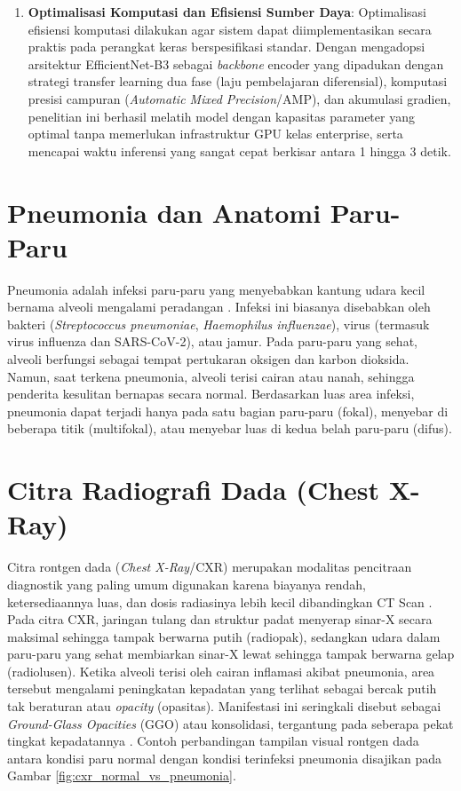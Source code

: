 \documentclass[12pt,a4paper,oneside]{book}
\begin{document}
\begin{enumerate}
  \item \textbf{Optimalisasi Komputasi dan Efisiensi Sumber Daya}: 
  Optimalisasi efisiensi komputasi dilakukan agar sistem dapat diimplementasikan secara praktis pada perangkat keras berspesifikasi standar. Dengan mengadopsi arsitektur EfficientNet-B3 sebagai \textit{backbone} encoder yang dipadukan dengan strategi transfer learning dua fase (laju pembelajaran diferensial), komputasi presisi campuran (\textit{Automatic Mixed Precision}/AMP), dan akumulasi gradien, penelitian ini berhasil melatih model dengan kapasitas parameter yang optimal tanpa memerlukan infrastruktur GPU kelas enterprise, serta mencapai waktu inferensi yang sangat cepat berkisar antara 1 hingga 3 detik.
\end{enumerate}


\section{Pneumonia dan Anatomi Paru-Paru}

Pneumonia adalah infeksi paru-paru yang menyebabkan kantung udara kecil bernama alveoli mengalami peradangan \parencite{xu2020}. Infeksi ini biasanya disebabkan oleh bakteri (\textit{Streptococcus pneumoniae}, \textit{Haemophilus influenzae}), virus (termasuk virus influenza dan SARS-CoV-2), atau jamur. Pada paru-paru yang sehat, alveoli berfungsi sebagai tempat pertukaran oksigen dan karbon dioksida. Namun, saat terkena pneumonia, alveoli terisi cairan atau nanah, sehingga penderita kesulitan bernapas secara normal. Berdasarkan luas area infeksi, pneumonia dapat terjadi hanya pada satu bagian paru-paru (fokal), menyebar di beberapa titik (multifokal), atau menyebar luas di kedua belah paru-paru (difus).

\section{Citra Radiografi Dada (Chest X-Ray)}

Citra rontgen dada (\textit{Chest X-Ray}/CXR) merupakan modalitas pencitraan diagnostik yang paling umum digunakan karena biayanya rendah, ketersediaannya luas, dan dosis radiasinya lebih kecil dibandingkan CT Scan \parencite{seth2022}. Pada citra CXR, jaringan tulang dan struktur padat menyerap sinar-X secara maksimal sehingga tampak berwarna putih (radiopak), sedangkan udara dalam paru-paru yang sehat membiarkan sinar-X lewat sehingga tampak berwarna gelap (radiolusen). Ketika alveoli terisi oleh cairan inflamasi akibat pneumonia, area tersebut mengalami peningkatan kepadatan yang terlihat sebagai bercak putih tak beraturan atau \textit{opacity} (opasitas). Manifestasi ini seringkali disebut sebagai \textit{Ground-Glass Opacities} (GGO) atau konsolidasi, tergantung pada seberapa pekat tingkat kepadatannya \parencite{teixeira2020}. Contoh perbandingan tampilan visual rontgen dada antara kondisi paru normal dengan kondisi terinfeksi pneumonia disajikan pada Gambar \ref{fig:cxr_normal_vs_pneumonia}.
\end{document}
